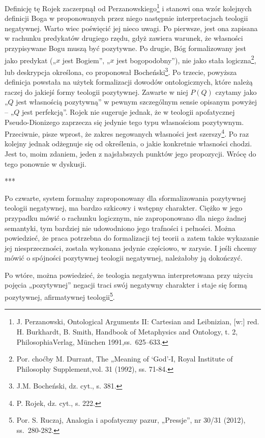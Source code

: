 Definicję tę Rojek zaczerpnął od Perzanowskiego\footnote{J.
Perzanowski, Ontological Arguments II: Cartesian and Leibnizian, [w:]
red. H. Burkhardt, B. Smith, Handbook of Metaphysics and Ontology, t.
2, PhilosophiaVerlag, München 1991,ss.~625–633. } i stanowi ona
wzór kolejnych definicji Boga w proponowanych przez niego następnie
interpretacjach teologii negatywnej. Warto wiec poświęcić jej nieco
uwagi. Po pierwsze, jest ona zapisana w rachunku predykatów drugiego
rzędu, gdyż zawiera warunek, że własności przypisywane Bogu muszą być
pozytywne. Po drugie, Bóg formalizowany jest jako predykat („$x$ jest
Bogiem”, „$x$ jest bogopodobny”), nie jako stała logiczna\footnote{Por.
choćby M. Durrant, The „Meaning of ‘God’-I, Royal Institute of
Philosophy Supplement,vol. 31 (1992), ss. 71-84. }, lub deskrypcja
określona, co proponował Bocheński\footnote{J.M. Bocheński, dz. cyt.,
s. 381. }. Po trzecie, powyższa definicja powstała na użytek
formalizacji dowodów ontologicznych, które należą raczej do jakiejś
formy teologii pozytywnej. Zawarte w niej $P(Q)$ czytamy jako „$Q$ jest
własnością pozytywną” w pewnym szczególnym sensie opisanym powyżej -- „$Q$
jest perfekcją”. Rojek nie sugeruje jednak, że w teologii apofatycznej
Pseudo-Dionizego zaprzecza się jedynie tego typu własnościom
pozytywnym. Przeciwnie, pisze wprost, że zakres negowanych własności
jest szerszy\footnote{P. Rojek, dz. cyt., s. 222. }. Po raz
kolejny jednak odżegnuje się od określenia, o jakie konkretnie
własności chodzi. Jest to, moim zdaniem, jeden z najsłabszych punktów
jego propozycji. Wrócę do tego ponownie w dyskusji.

***







Po czwarte, system formalny zaproponowany dla sformalizowania pozytywnej
teologii negatywnej, ma bardzo szkicowy i wstępny charakter. Ciężko w
jego przypadku mówić o rachunku logicznym, nie zaproponowano dla niego
żadnej semantyki, tym bardziej nie udowodniono jego trafności i
pełności. Można powiedzieć, że praca potrzebna do formalizacji tej
teorii a zatem także wykazanie jej niesprzeczności, została wykonana
jedynie częściowo, w zarysie. I jeśli chcemy mówić o spójności
pozytywnej teologii negatywnej, należałoby ją dokończyć.

Po wtóre, można powiedzieć, że teologia negatywna interpretowana przy
użyciu pojęcia „pozytywnej” negacji traci swój negatywny charakter i
staje się formą pozytywnej, afirmatywnej teologii\footnote{Por. S.
Ruczaj, Analogia i apofatyczny pazur, „Pressje”, nr 30/31 (2012),
ss.~280-282.}.

